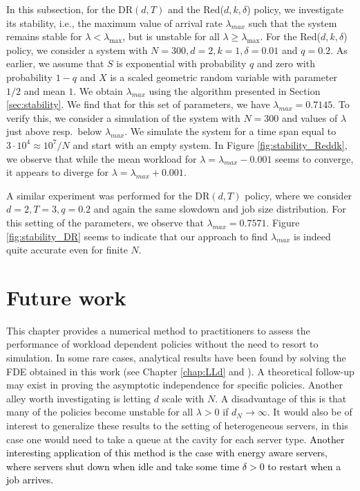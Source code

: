 \documentclass[12pt]{report}
\begin{document}
In this subsection, for the DR$(d,T)$ and the Red($d,k,\delta$) policy, we investigate its stability, i.e., the maximum value of arrival rate $\lambda_{max}$ such that the system remains stable for $\lambda < \lambda_{\max}$, but is unstable for all $\lambda \geq \lambda_{\max}$. For the Red($d,k,\delta$) policy, we consider a system with $N=300, d=2, k=1, \delta=0.01$ and $q=0.2$. As earlier, we assume  that $S$ is exponential with probability $q$ and zero with probability $1-q$ and $X$ is a scaled geometric random variable with parameter $1/2$ and mean $1$. We obtain $\lambda_{max}$ using the algorithm presented in Section \ref{sec:stability}. We find that for this set of parameters, we have $\lambda_{max} = 0.7145$. To verify this, we consider a simulation of the system with  $N=300$ and values of $\lambda$ just above resp.~below $\lambda_{max}$. We simulate the system for a time span equal to $3\cdot 10^4 \approx 10^7/N$ and start with an empty system. In Figure \ref{fig:stability_Reddk}, we observe that while the mean workload for $\lambda=\lambda_{max}-0.001$ seems to converge, it appears to diverge for $\lambda=\lambda_{max} + 0.001$.

A similar experiment was performed for the DR$(d,T)$ policy, where
we consider $d=2, T=3, q=0.2$ and again the same slowdown and job size distribution. For this setting 
of the parameters, we observe that $\lambda_{max} = 0.7571$. 
Figure \ref{fig:stability_DR} seems to indicate that our approach to find $\lambda_{max}$ is indeed
quite accurate even for finite $N$.

\section{Future work} \label{sec:future_work_WL}
This chapter provides a numerical method to practitioners to assess the performance
of workload dependent policies without the need to resort to simulation. 
In some rare cases, analytical results have been found by solving the FDE obtained in this work
(see Chapter \ref{chap:LLd} and \cite{gardnerOR}).
A theoretical follow-up may exist in proving the asymptotic independence for specific policies.
Another alley worth investigating is letting $d$ scale with $N$. A disadvantage of this is that many of the policies become unstable for all $\lambda >0$ if $d_N \rightarrow \infty$.
It would also be of interest to generalize these results to the setting of heterogeneous servers, in this case one would need to take a queue at the cavity for each server type. \textcolor{black}{Another interesting application of this method is the case with energy aware servers, where servers shut down when idle and take some time $\delta > 0$ to restart when a job arrives.}
\end{document}
